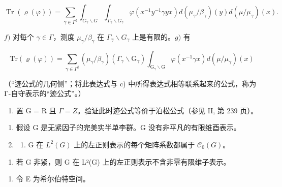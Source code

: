 \[
\operatorname{Tr} (\varrho (\varphi)) = \sum_ {\gamma \in \Gamma^ {\sharp}} \int_ {G _ {\gamma} \backslash G} \int_ {\Gamma_ {\gamma} \backslash G _ {\gamma}} \varphi (x ^ {- 1} y ^ {- 1} \gamma y x) d (\mu_ {\gamma} / \beta_ {\gamma}) (y) d (\mu / \mu_ {\gamma}) (x).
\]

\(f)\) 对每个 \(\gamma \in \Gamma\)，测度 \(\mu_{\gamma} / \beta_{\gamma}\) 在 \(\Gamma_{\gamma} \backslash G_{\gamma}\) 上是有限的。\(g)\) 有

\[
\mathrm{Tr} (\varrho (\varphi)) = \sum_ {\gamma \in \Gamma^ {\sharp}} (\mu_ {\gamma} / \beta_ {\gamma}) (\Gamma_ {\gamma} \backslash \mathrm{G} _ {\gamma}) \int_ {\mathrm{G} _ {\gamma} \backslash \mathrm{G}} \varphi (x ^ {- 1} \gamma x) d (\mu / \mu_ {\gamma}) (x)
\]

（“迹公式的几何侧”；将此表达式与 c) 中所得表达式相等联系起来的公式，称为 Γ-自守表示的“迹公式”。）

\begin{enumerate}
\def\labelenumi{\alph{enumi})}
\setcounter{enumi}{7}
\tightlist
\item
  置 G = R 且 \(\Gamma = Z\)。验证此时迹公式等价于泊松公式（参见 II, 第 239 页）。
\end{enumerate}

\begin{enumerate}
\def\labelenumi{\arabic{enumi})}
\setcounter{enumi}{8}
\item
  假设 G 是无紧因子的完美实半单李群。G 没有非平凡的有限维酉表示。
\item
  \begin{enumerate}
  \def\labelenumii{\alph{enumii})}
  \tightlist
  \item
    G 在 \(L^{2}(G)\) 上的左正则表示的每个矩阵系数都属于 \(\mathcal{C}_{0}(G)\)。
  \end{enumerate}
\end{enumerate}

\begin{enumerate}
\def\labelenumi{\alph{enumi})}
\setcounter{enumi}{1}
\tightlist
\item
  若 G 非紧，则 G 在 L²(G) 上的左正则表示不含非零有限维子表示。
\end{enumerate}

\begin{enumerate}
\def\labelenumi{\arabic{enumi})}
\setcounter{enumi}{10}
\tightlist
\item
  令 E 为希尔伯特空间。
\end{enumerate}


